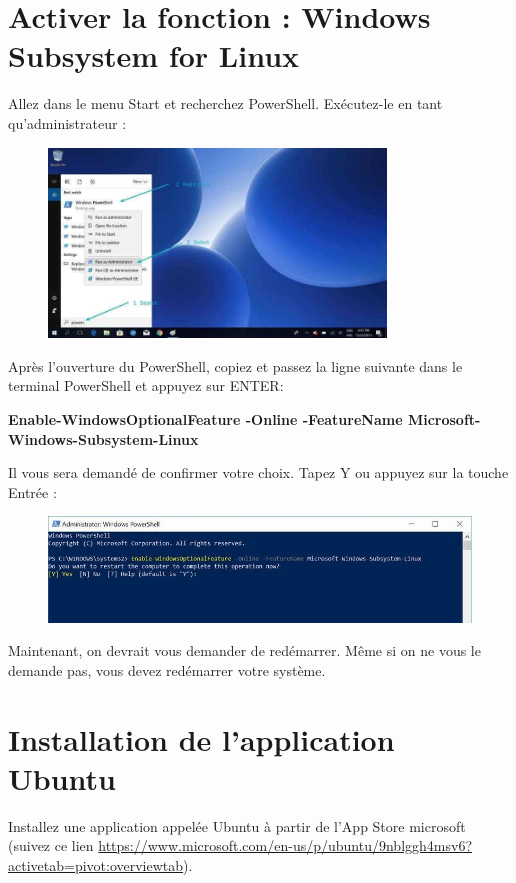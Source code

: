 \documentclass{article}
\begin{document}
\section{Activer la fonction : Windows Subsystem for Linux}
Allez dans le menu Start et recherchez PowerShell. Exécutez-le en tant qu'administrateur :
\begin{figure}[H]
\center
\includegraphics[width=0.8\textwidth]{Plots/Powershell-Ubuntu-install.jpg}
\end{figure}
Après l'ouverture du PowerShell, copiez et passez la ligne suivante dans le terminal PowerShell et appuyez sur ENTER:

\begin{tcolorbox}[width=\textwidth,colback={purple},title={PowerShell terminal},outer arc=0mm,colupper=white]    
    \large\textbf{ Enable-WindowsOptionalFeature -Online -FeatureName Microsoft-Windows-Subsystem-Linux }
\end{tcolorbox}
Il vous sera demandé de confirmer votre choix. Tapez Y ou appuyez sur la touche Entrée :
\begin{figure}[H]
\includegraphics[width=1\textwidth]{Plots/Powershell-Ubuntu-install-2.jpg}
\end{figure}

Maintenant, on devrait vous demander de redémarrer. Même si on ne vous le demande pas, vous devez redémarrer votre système.

\section{Installation de l'application Ubuntu}
Installez une application appelée Ubuntu à partir de l'App Store microsoft (suivez ce lien \href{https://www.microsoft.com/en-us/p/ubuntu/9nblggh4msv6?activetab=pivot:overviewtab}{https://www.microsoft.com/en-us/p/ubuntu/9nblggh4msv6?activetab=pivot:overviewtab}).
\end{document}

